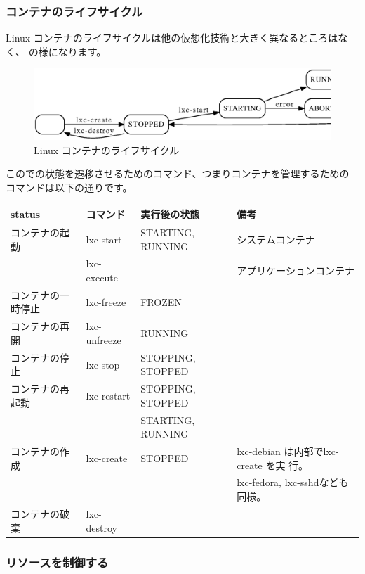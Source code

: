 \documentclass[mingoth,a4paper]{jsarticle}
\begin{document}
\subsubsection{コンテナのライフサイクル}

Linux コンテナのライフサイクルは他の仮想化技術と大きく異なるところはなく、
の様になります。

\begin{figure}[h!]
 \begin{center}
 \includegraphics[width=0.6\hsize]{image200912/lxc/lxc-lifecycle.eps}
 \end{center}
 \caption{Linux コンテナのライフサイクル}
 \label{fig:lxc-lifecycle}
\end{figure}

このでの状態を遷移させるためのコマンド、つまりコンテナを管理するための
コマンドは以下の通りです。

{\footnotesize
\begin{tabular}[t]{|p{8em}|p{6em}|p{16em}|p{18em}|}
\hline
status &コマンド &実行後の状態 &備考 \\
\hline
\hline
コンテナの起動 &lxc-start &STARTING, RUNNING &システムコンテナ \\
&lxc-execute & &アプリケーションコンテナ\\
\hline
コンテナの一時停止 &lxc-freeze &FROZEN & \\
\hline
コンテナの再開 &lxc-unfreeze &RUNNING & \\
\hline
コンテナの停止 &lxc-stop &STOPPING, STOPPED & \\
\hline
コンテナの再起動 &lxc-restart &STOPPING, STOPPED & \\
& &STARTING, RUNNING & \\
\hline
コンテナの作成 &lxc-create &STOPPED &lxc-debian は内部でlxc-create を実
	     行。 \\
& & &lxc-fedora, lxc-sshdなども同様。 \\
\hline
コンテナの破棄 &lxc-destroy & & \\
\hline
\end{tabular}}

\subsubsection{リソースを制御する}
\end{document}
